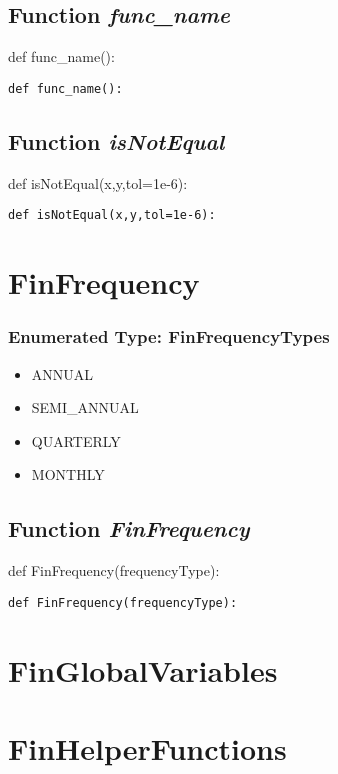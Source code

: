 \documentclass[twoside,11pt]{book}
\begin{document}
\subsection{Function {\it func\_name}}
def func\_name():

\begin{lstlisting}
def func_name():
\end{lstlisting}

\subsection{Function {\it isNotEqual}}
def isNotEqual(x,y,tol=1e-6):

\begin{lstlisting}
def isNotEqual(x,y,tol=1e-6):
\end{lstlisting}

\newpage
\section{FinFrequency}

\subsubsection{Enumerated Type: FinFrequencyTypes}
\begin{itemize}
\item{ANNUAL}
\item{SEMI\_ANNUAL}
\item{QUARTERLY}
\item{MONTHLY}
\end{itemize}

\subsection{Function {\it FinFrequency}}
def FinFrequency(frequencyType):

\begin{lstlisting}
def FinFrequency(frequencyType):
\end{lstlisting}

\newpage
\section{FinGlobalVariables}

\newpage
\section{FinHelperFunctions}
\end{document}
